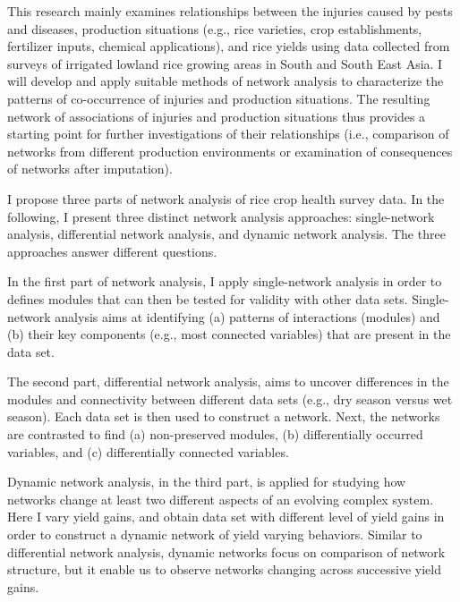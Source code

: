 

This research mainly examines relationships between the injuries caused by pests and diseases, production situations (e.g., rice varieties, crop establishments, fertilizer inputs, chemical applications), and rice yields using data collected from surveys of irrigated lowland rice growing areas in South and South East Asia. I will develop and apply suitable methods of network analysis to characterize the patterns of co-occurrence of injuries and production situations. The resulting network of associations of injuries and production situations thus provides a starting point for further investigations of their relationships (i.e., comparison of networks from different production environments or examination of consequences of networks after imputation).

I propose three parts of network analysis of rice crop health survey data. In the following, I present three distinct network analysis approaches: single-network analysis, differential network analysis, and dynamic network analysis. The three approaches answer different questions. 

In the first part of network analysis, I apply single-network analysis in order to defines modules that can then be tested for validity with other data sets. Single-network analysis aims at identifying (a) patterns of interactions (modules) and (b) their key components (e.g., most connected variables) that are present in the data set.


The second part, differential network analysis, aims to uncover differences in the modules and connectivity between different data sets (e.g., dry season versus wet season). Each data set is then used to construct a network. Next, the networks are contrasted to find (a) non-preserved modules, (b) differentially occurred variables, and (c) differentially connected variables. 


Dynamic network analysis, in the third part, is applied for studying how networks change at least two different aspects of an evolving complex system. Here I vary yield gains, and obtain data set with different level of yield gains in order to construct a dynamic network of yield varying behaviors. Similar to differential network analysis, dynamic networks focus on comparison of network structure, but it enable us to observe networks changing across successive yield gains. 


